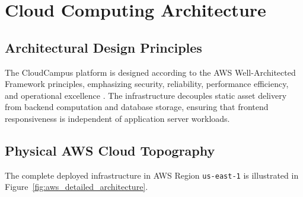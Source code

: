 \newpage
\section{Cloud Computing Architecture}

\subsection{Architectural Design Principles}
The CloudCampus platform is designed according to the AWS Well-Architected Framework principles, emphasizing security, reliability, performance efficiency, and operational excellence \cite{aws_s3, aws_ec2}. The infrastructure decouples static asset delivery from backend computation and database storage, ensuring that frontend responsiveness is independent of application server workloads.

\subsection{Physical AWS Cloud Topography}
The complete deployed infrastructure in AWS Region \texttt{us-east-1} is illustrated in Figure~\ref{fig:aws_detailed_architecture}.

